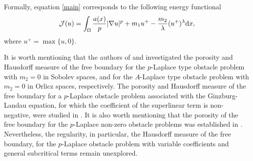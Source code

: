 \documentclass[onecolumn]{autart}
\begin{document}
Formally,  equation \eqref{main} corresponds to the following energy functional
\begin{align}
	\mathcal{J}(u) = \int_{\Omega} \frac{a(x)}{p}|\nabla u|^p + m_1 u^+ - \frac{m_2}{\lambda}(u^+)^{\lambda}   \mathrm{d}x,\notag
\end{align}
where $u^+ = \max\{u, 0\}.$



It is worth mentioning that the authors of \cite{Karp:2000, Lee:2003, Zhao:2012,Zheng:2013} and \cite{Challal:2009, Challal:2012} investigated the porosity and Hausdorff measure of the free boundary for the $p$-Laplace type obstacle problem with $m_2 = 0$ in Sobolev spaces, and for the $A$-Laplace type obstacle problem with $m_2 = 0$ in Orlicz spaces, respectively. The porosity and Hausdorff measure of the free boundary for a $p$-Laplace obstacle problem associated with the Ginzburg-Landau equation, for which the coefficient of the  superlinear term is non-negative,  were studied in \cite{Hu:2025}.   It is also worth mentioning that  the porosity of the free boundary for the $p$-Laplace  non-zero obstacle problems  was established in  \cite{Andersson:2015}. Nevertheless, the regularity, in particular, the Hausdorff measure of the free boundary,  for the $p$-Laplace obstacle problem  with variable coefficients and  general subcritical terms remain unexplored.




\end{document}
